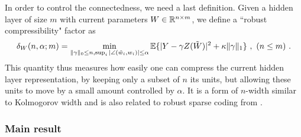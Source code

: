In order to control the connectedness, we need a last definition. Given a 
hidden layer of size $m$ with current parameters $W \in {\mathbb{R}}^{n \times m}$, we define a
``robust compressibility" factor as 
\begin{equation}
\label{compress}
\delta_W(n, \alpha; m) = \min_{ \|\gamma \|_0 \leq n, \sup_i |\angle(\tilde{w}_i, w_i)| \leq \alpha} {\mathbb{E}} \{| Y - \gamma Z(\tilde{W}) |^2 + \kappa \| \gamma \|_1  \}~,~(n \leq m)~.
\end{equation} 
This quantity thus measures how easily one can compress the current hidden layer representation, 
by keeping only a subset of $n$ its units, but allowing these units to move by a small amount controlled by $\alpha$. It is a form 
of $n$-width similar to Kolmogorov width \cite{donoho} and is also related to robust sparse coding from \cite{simoncelli_robust}.


\subsubsection{Main result}

